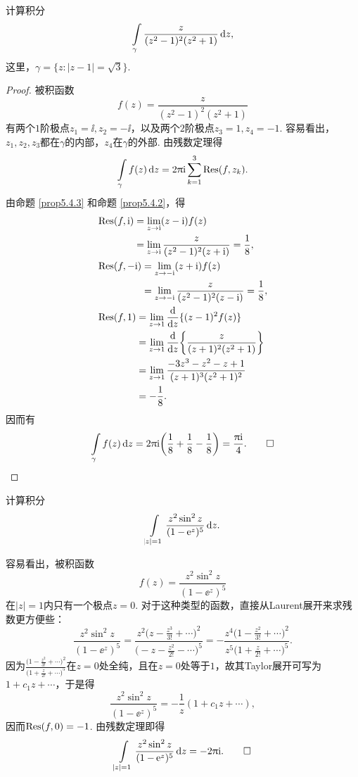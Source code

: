 \begin{example}\label{exam5.4.10}
  计算积分
  \[
    \int\limits_{\gamma} \frac{z}{(z^2-1)^2(z^2+1)} \mathop{}\!\mathrm dz,
  \]
  这里，$\gamma=\{z:|z-1|=\sqrt3\}$.
\end{example}
\begin{proof}被积函数
  \[
    f(z) = \frac{z}{(z^2-1)^2(z^2+1)}
  \]
  有两个$1$阶极点$z_1=\ii,z_2=-\ii$，以及两个$2$阶极点$z_3=1,z_4=-1$. 容易看出，$z_1,z_2,z_3$都在$\gamma$的内部，$z_4$在$\gamma$的外部. 由残数定理得
  \[
    \int\limits_\gamma f(z)\mathop{}\!\mathrm dz = 2\uppi\mathrm i\sum_{k=1}^3\operatorname*{Res}(f,z_k).
  \]
  由命题 \ref{prop5.4.3} 和命题 \ref{prop5.4.2}，得
  \begin{align*}
    & \begin{aligned}
        \operatorname*{Res}(f,\mathrm i) & = \lim_{z\to\mathrm i}(z-\mathrm i)f(z) \\
        & = \lim_{z\to\mathrm i}\frac{z}{(z^2-1)^2(z+\mathrm i)}=\frac18,
      \end{aligned}\\
    & \begin{aligned}
        \operatorname*{Res}(f,-\mathrm i) & = \lim_{z\to-\mathrm i}(z+\mathrm i)f(z)\\
        & = \lim_{z\to-\mathrm i}\frac{z}{(z^2-1)^2(z-\mathrm i)} = \frac18,
      \end{aligned}\\
    & \begin{aligned}
        \operatorname*{Res}(f,1) & = \lim_{z\to1} \frac{\mathop{}\!\mathrm d}{\mathop{}\!\mathrm dz}\{(z-1)^2f(z)\} \\
        & = \lim_{z\to1}\frac{\mathop{}\!\mathrm d}{\mathop{}\!\mathrm dz}\bigg\{\frac z{(z+1)^2(z^2+1)}\bigg\}\\
        & = \lim_{z\to1}\frac{-3z^3-z^2-z+1}{(z+1)^3(z^2+1)^2}\\
        & = -\frac18.
      \end{aligned}
  \end{align*}
    因而有
    \[
      \int\limits_\gamma f(z)\mathop{}\!\mathrm dz=2\uppi\mathrm i\bigg(\frac18 + \frac18 - \frac18\bigg)
      = \frac{\uppi\mathrm i}4. \qedhere
    \]
\end{proof}

\begin{example}\label{exam5.4.11}
  计算积分
  \[
    \int\limits_{|z|=1} \frac{z^2\sin^2z}{(1-\operatorname{\!\!\;\mathrm e}^z)^5}\mathop{}\!\mathrm dz.
  \]
\end{example}
\begin{solution}
  容易看出，被积函数
  \[
    f(z) = \frac{z^2\sin^2z}{(1-\ee^z)^5}
  \]
  在$|z|=1$内只有一个极点$z=0$. 对于这种类型的函数，直接从Laurent展开来求残数更方便些：
  \[
    \frac{z^2\sin^2z}{(1-\ee^z)^5}
    = \frac{z^2\big(z-\frac{z^3}{3!}+\cdots\big)^2}{\big(-z-\frac{z^2}{2!}-\cdots\big)^5}
    = -\frac{z^4\big(1-\frac{z^2}{3!}+\cdots\big)^2}{z^5\big(1+\frac z{2!}+\cdots\big)^5}.
  \]
  因为$\frac{\big(1-\frac{z^2}{3!}+\cdots\big)^2}{\big(1+\frac z{2!}+\cdots\big)^5}$在$z=0$处全纯，且在$z=0$处等于$1$，故其Taylor展开可写为$1+c_1z+\cdots$，于是得
  \[
    \frac{z^2\sin^2z}{(1-\ee^z)^5} = -\frac1z(1+c_1z+\cdots),
  \]
  因而$\operatorname*{Res}(f,0)=-1$. 由残数定理即得
  \begin{equation*}
    \int\limits_{|z|=1}\frac{z^2\sin^2z}{(1-\operatorname{\!\!\;\mathrm e}^z)^5}\mathop{}\!\mathrm dz = -2\uppi\mathrm i. \qedhere
  \end{equation*}
\end{solution}

